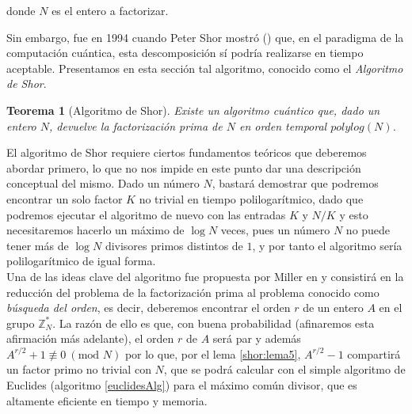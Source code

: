 \documentclass[11pt, spanish]{report}
\numberwithin{equation}{section}
\newtheorem{teo}[defin]{Teorema}
\numberwithin{defin}{section}
\newenvironment{yellowBox}{\begin{tcolorbox}[colback=yellow!5!white,colframe=yellow!75!black]}{\end{tcolorbox}}
\begin{document}
donde $N$ es el entero a factorizar.\\




Sin embargo, fue en 1994 cuando Peter Shor mostró (\cite{1995quant.ph..8027S}) que, en el paradigma de la computación cuántica, esta descomposición sí podría realizarse en tiempo aceptable. Presentamos en esta sección tal algoritmo, conocido como el \emph{Algoritmo de Shor}.\\

\begin{yellowBox}
\begin{teo}[Algoritmo de Shor]\label{Shor} 
Existe un algoritmo cuántico que, dado un entero $N$, devuelve la factorización prima de $N$ en orden temporal\footnotemark{} $polylog(N)$.
\end{teo}
\end{yellowBox}


El algoritmo de Shor requiere ciertos fundamentos teóricos que deberemos abordar primero, lo que no nos impide en este punto dar una descripción conceptual del mismo. Dado un número $N$, bastará demostrar que podremos encontrar un solo factor $K$ no trivial en tiempo polilogarítmico, dado que podremos ejecutar el algoritmo de nuevo con las entradas $K$ y $N/K$ y esto necesitaremos hacerlo un máximo de $\log N$ veces, pues un número $N$ no puede tener más de $\log N$ divisores primos distintos de $1$, y por tanto el algoritmo sería polilogarítmico de igual forma.\\

Una de las ideas clave del algoritmo fue propuesta por Miller en \cite{MILLER1976300} y consistirá en la reducción del problema de la factorización prima al problema conocido como \textit{búsqueda del orden}, es decir, deberemos encontrar el orden $r$ de un entero $A$ en el grupo $\mathbb{Z}_N^*$. La razón de ello es que, con buena probabilidad (afinaremos esta afirmación más adelante), el orden $r$ de $A$ será par y además $A^{r/2}+1 \not\equiv 0\ (\text{mod } N)$ por lo que, por el lema \ref{shor:lema5}, $A^{r/2}-1$ compartirá un factor primo no trivial con $N$, que se podrá calcular con el simple algoritmo de Euclides (algoritmo \ref{euclidesAlg}) para el máximo común divisor, que es altamente eficiente en tiempo y memoria.\\
\end{document}
